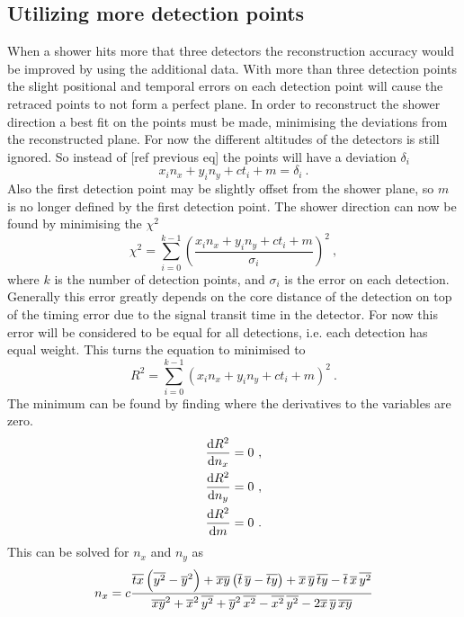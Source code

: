 \subsection{Utilizing more detection points}

When a shower hits more that three detectors the reconstruction accuracy would be improved by using the additional data. With more than three detection points the slight positional and temporal errors on each detection point will cause the retraced points to not form a perfect plane. In order to reconstruct the shower direction a best fit on the points must be made, minimising the deviations from the reconstructed plane. For now the different altitudes of the detectors is still ignored. So instead of [ref previous eq] the points will have a deviation $\delta_i$
%
\begin{equation}
    x_i n_x + y_i n_y + c t_i + m = \delta_i \ .
\end{equation}
%
Also the first detection point may be slightly offset from the shower plane, so $m$ is no longer defined by the first detection point. The shower direction can now be found by minimising the $\chi^2$
%
\begin{equation}
    \chi^2 = \sum_{i = 0}^{k - 1}
             \left(\frac{x_i n_x + y_i n_y + c t_i + m}
                        {\sigma_i} \right)^2 \ ,
\end{equation}
%
where $k$ is the number of detection points, and $\sigma_i$ is the error on each detection. Generally this error greatly depends on the core distance of the detection on top of the timing error due to the signal transit time in the detector. For now this error will be considered to be equal for all detections, i.e. each detection has equal weight. This turns the equation to minimised to
%
\begin{equation}
    R^2 = \sum_{i = 0}^{k - 1} \left(x_i n_x + y_i n_y + c t_i + m \right)^2 \ .
\end{equation}
%
The minimum can be found by finding where the derivatives to the variables are zero.
%
\begin{equation}
    \begin{align}
        \frac{\mathrm{d} R^2}{\mathrm{d} n_x} &= 0 \ , \\
        \frac{\mathrm{d} R^2}{\mathrm{d} n_y} &= 0 \ , \\
        \frac{\mathrm{d} R^2}{\mathrm{d} m} &= 0 \ .
    \end{align}
\end{equation}
%
This can be solved for $n_x$ and $n_y$ as
%
\begin{equation}\label{eq:regression_nx}
    n_x = c \frac{\overline{t x} \left( \overline{y^2} - \overline{y}^2 \right) +
                  \overline{x y} \left( \overline{t} \, \overline{y} - \overline{t y} \right) +
                  \overline{x} \, \overline{y} \, \overline{t y} -
                  \overline{t} \, \overline{x} \, \overline{y^2}}
                 {\overline{x y}^2 + \overline{x}^2 \, \overline{y^2} +
                  \overline{y}^2 \, \overline{x^2} - \overline{x^2} \, \overline{y^2} -
                  2 \overline{x} \, \overline{y} \, \overline{x y}}
\end{equation}
